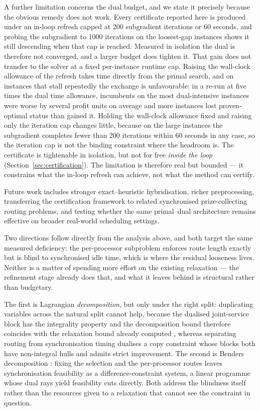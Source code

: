 \documentclass[preprint,12pt]{elsarticle}
\begin{document}
A further limitation concerns the dual budget, and we state it precisely because the obvious remedy does not work. Every certificate reported here is produced under an in-loop refresh capped at 200 subgradient iterations or 60 seconds, and probing the subgradient to 1000 iterations on the loosest-gap instances shows it still descending when that cap is reached. Measured in isolation the dual is therefore not converged, and a larger budget does tighten it. That gain does not transfer to the solver at a fixed per-instance runtime cap. Raising the wall-clock allowance of the refresh takes time directly from the primal search, and on instances that stall repeatedly the exchange is unfavourable: in a re-run at five times the dual time allowance, incumbents on the most dual-intensive instances were worse by several profit units on average and more instances lost proven-optimal status than gained it. Holding the wall-clock allowance fixed and raising only the iteration cap changes little, because on the large instances the subgradient completes fewer than 200 iterations within 60 seconds in any case, so the iteration cap is not the binding constraint where the headroom is. The certificate is tightenable in isolation, but not for free \emph{inside the loop} (Section~\ref{sec:certification}). The limitation is therefore real but bounded --- it constrains what the in-loop refresh can achieve, not what the method can certify.

Future work includes stronger exact--heuristic hybridisation, richer preprocessing, transferring the certification framework to related synchronised prize-collecting routing problems, and testing whether the same primal--dual architecture remains effective on broader real-world scheduling settings.

Two directions follow directly from the analysis above, and both target the same measured deficiency: the per-processor subproblem enforces route length exactly but is blind to synchronised idle time, which is where the residual looseness lives. Neither is a matter of spending more effort on the existing relaxation --- the refinement stage already does that, and what it leaves behind is structural rather than budgetary.

The first is Lagrangian \emph{decomposition}, but only under the right split: duplicating variables across the natural split cannot help, because the dualised joint-service block has the integrality property and the decomposition bound therefore coincides with the relaxation bound already computed \cite{GuignardKim1987LD,Geoffrion1974Lagrangean}, whereas separating routing from synchronisation timing dualises a copy constraint whose blocks both have non-integral hulls and admits strict improvement. The second is Benders decomposition \cite{Benders1962Partitioning}: fixing the selection and the per-processor routes leaves synchronisation feasibility as a difference-constraint system, a linear programme whose dual rays yield feasibility cuts directly. Both address the blindness itself rather than the resources given to a relaxation that cannot see the constraint in question.
\end{document}
